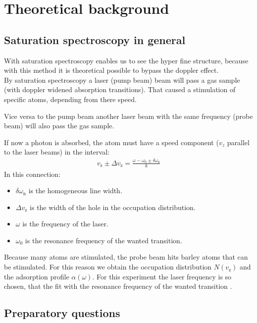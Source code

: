 \chapter{Theoretical background}

\section{Saturation spectroscopy in general}
With saturation spectroscopy enables us to see the hyper fine structure, because with this method it is theoretical possible to bypass the doppler effect. \\
By saturation spectroscopy a laser (pump beam) beam will pass a gas sample (with doppler widened absorption transitions). That caused a stimulation of specific atoms, depending from there speed. 

Vice versa to the pump beam another laser beam with the same frequency (probe beam) will also pass the gas sample.

If now a photon is absorbed, the atom must have a speed component ($v_z$ parallel to the laser beams) in the interval: 
\begin{align}
    v_{\text{z}} \pm \Delta v_{\text{z}} = \frac{\omega -\omega_0 \pm \delta \omega_{\text{n}}}{k}
\end{align}
In this connection: 
\begin{itemize} 
    \item $\delta \omega_{\text{n}}$ is the homogeneous line width.
    \item $\Delta v_{\text{z}}$ is the width of the hole in the occupation distribution.
    \item $\omega$ is the frequency of the laser.
    \item $\omega_0$ is the resonance frequency of the wanted transition.
\end{itemize}

Because many atoms are stimulated, the probe beam hits barley atoms that can be stimulated. For this reason we obtain the occupation distribution $N(v_{\text{z}})$ and the adsorption profile $\alpha(\omega)$. For this experiment the laser frequency is so chosen, that the fit with the resonance frequency of the wanted transition \citep{VA00}.

\section{Preparatory questions}

